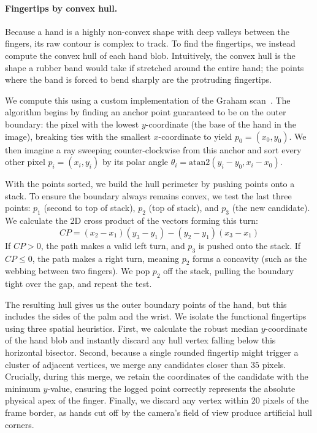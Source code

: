 \documentclass[11pt]{article}
\begin{document}
\paragraph{Fingertips by convex hull.}
Because a hand is a highly non-convex shape with deep valleys between the fingers, 
its raw contour is complex to track. To find the fingertips, we instead compute the 
convex hull of each hand blob. Intuitively, the convex hull is the shape a rubber 
band would take if stretched around the entire hand; the points where the band is 
forced to bend sharply are the protruding fingertips. 

We compute this using a custom implementation of the Graham scan~\cite{graham1972convexhull}. 
The algorithm begins by finding an anchor point guaranteed to be on the outer boundary: 
the pixel with the lowest $y$-coordinate (the base of the hand in the image), breaking 
ties with the smallest $x$-coordinate to yield $p_0 = (x_0, y_0)$. We then imagine a ray 
sweeping counter-clockwise from this anchor and sort every other pixel $p_i = (x_i, y_i)$ 
by its polar angle $\theta_i = \text{atan2}(y_i - y_0, x_i - x_0)$.

With the points sorted, we build the hull perimeter by pushing points onto a stack. 
To ensure the boundary always remains convex, we test the last three points: $p_1$ 
(second to top of stack), $p_2$ (top of stack), and $p_3$ (the new candidate). 
We calculate the 2D cross product of the vectors forming this turn:
\begin{equation}
    CP = (x_2 - x_1)(y_3 - y_1) - (y_2 - y_1)(x_3 - x_1)
\end{equation}
If $CP > 0$, the path makes a valid left turn, and $p_3$ is pushed onto the stack. 
If $CP \le 0$, the path makes a right turn, meaning $p_2$ forms a concavity (such as 
the webbing between two fingers). We pop $p_2$ off the stack, pulling the boundary 
tight over the gap, and repeat the test.

The resulting hull gives us the outer boundary points of the hand, but this includes 
the sides of the palm and the wrist. We isolate the functional fingertips using three 
spatial heuristics. First, we calculate the robust median $y$-coordinate of the hand 
blob and instantly discard any hull vertex falling below this horizontal bisector. 
Second, because a single rounded fingertip might trigger a cluster of adjacent vertices, 
we merge any candidates closer than $35$ pixels. Crucially, during this merge, we 
retain the coordinates of the candidate with the minimum $y$-value, ensuring the logged 
point correctly represents the absolute physical apex of the finger. Finally, we discard 
any vertex within $20$ pixels of the frame border, as hands cut off by the camera's 
field of view produce artificial hull corners. 
\end{document}
